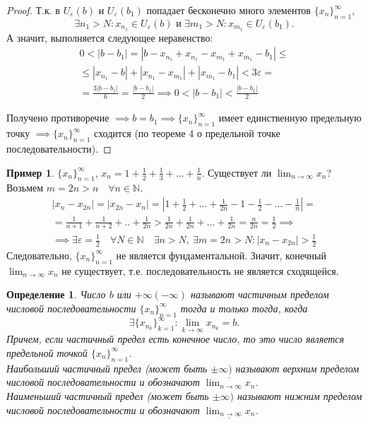 \documentclass[a4paper,12pt]{article} %
\newtheorem{definition}{Определение}[section]
\theoremstyle{remark}
\theoremstyle{definition}
\newtheorem{exmp}{Пример}[section]
\begin{document}
\begin{proof}
	Т.к. в $U_\varepsilon(b)$ и $U_\varepsilon(b_1)$ попадает бесконечно много элементов $\{x_n\}_{n=1}^{\infty}$,
\[
	\exists  n_1>N : x_{n_1} \in  U_\varepsilon(b) \text{ \ и \ } \exists m_1>N : x_{m_1} \in U_\varepsilon(b_1)
.\] 
А значит, выполняется следующее неравенство:
\begin{multline}
	0 < |b-b_1| = |b-x_{n_1} + x_{n_1} - x_{m_1} + x_{m_1} - b_1| \le \\
	\le |x_{n_1} - b| + |x_{n_1} - x_{m_1}| + |x_{m_1} - b_1| <3\varepsilon = \\
	= \frac{3|b-b_1|}{6} = \frac{|b-b_1|}{2} \implies 0 < |b-b_1| < \frac{|b-b_1|}{2}
\end{multline}

Получено противоречие $\implies b=b_1 \implies \{x_n\}_{n=1}^{\infty}$ имеет единственную предельную точку $\implies \{x_n\}_{n=1}^{\infty}$ сходится (по теореме 4 о предельной точке последовательности).
\end{proof}

\begin{exmp}
	$\{x_n\}_{n=1}^{\infty}$, $x_{n} = 1 + \frac{1}{2} + \frac{1}{3} + \ldots + \frac{1}{n}$. Существует ли $\lim_{n \to \infty} x_n$?
	Возьмем $m = 2n > n \quad \forall n \in  \mathbb{N}$.
	\begin{multline}
		|x_{n} - x_{2n}| = |x_{2n} - x_{n}| = |1 + \frac{1}{2} + \ldots + \frac{1}{2n} - 1 - \frac{1}{2} -\ldots - \frac{1}{n}| = \\
	= \frac{1}{n+1} + \frac{1}{n+2} + .. + \frac{1}{2n} > \frac{1}{2n} + \frac{1}{2n} + \ldots + \frac{1}{2n} = \frac{n}{2n} = \frac{1}{2} \implies \\
	\implies \exists \varepsilon=\frac{1}{2} \quad \forall N\in  \mathbb{N} \quad \exists n>N, \ \exists m=2n>N : |x_{n}-x_{2n}| > \frac{1}{2}
	\end{multline}
	Следовательно, $\{x_n\}_{n=1}^{\infty}$ не является фундаментальной. Значит, конечный $\lim_{n \to \infty} x_n$ не существует, т.е. последовательность не является сходящейся.
\end{exmp}


\begin{definition}
	Число $b$ или $+\infty(-\infty)$ называют частичным пределом числовой последовательности $\{x_n\}_{n=1}^{\infty}$ тогда и только тогда, когда
	\[
		\exists  \{x_{n_k}\}_{k=1}^{\infty} : \lim_{k \to \infty} x_{n_k} = b
	.\] 
	Причем, если частичный предел есть конечное число, то это число является предельной точкой $\{x_n\}_{n=1}^{\infty}$. \\
	Наибольший частичный предел (может быть $\pm\infty)$ называют верхним пределом числовой последовательности и обозначают $\overline{\lim_{n \to \infty} x_n}$. \\
	Наименьший частичный предел (может быть $\pm\infty)$ называют нижним пределом числовой последовательности и обозначают $\underline{\lim_{n \to \infty} x_n}$.
\end{definition}
\end{document}
